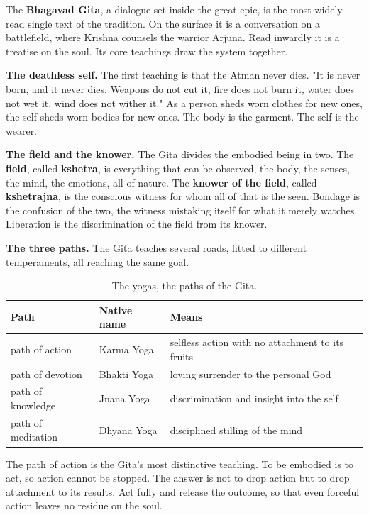 The \textbf{Bhagavad Gita}, a dialogue set inside the great epic, is the most widely read single text of the tradition. On the surface it is a conversation on a battlefield, where Krishna counsels the warrior Arjuna. Read inwardly it is a treatise on the soul. Its core teachings draw the system together.

\textbf{The deathless self.} The first teaching is that the Atman never dies. "It is never born, and it never dies. Weapons do not cut it, fire does not burn it, water does not wet it, wind does not wither it." As a person sheds worn clothes for new ones, the self sheds worn bodies for new ones. The body is the garment. The self is the wearer.

\textbf{The field and the knower.} The Gita divides the embodied being in two. The \textbf{field}, called \textbf{kshetra}, is everything that can be observed, the body, the senses, the mind, the emotions, all of nature. The \textbf{knower of the field}, called \textbf{kshetrajna}, is the conscious witness for whom all of that is the seen. Bondage is the confusion of the two, the witness mistaking itself for what it merely watches. Liberation is the discrimination of the field from its knower.

\textbf{The three paths.} The Gita teaches several roads, fitted to different temperaments, all reaching the same goal.

\begin{longtable}{@{} L{0.26\textwidth}L{0.22\textwidth}L{0.40\textwidth}@{}}
\caption{The yogas, the paths of the Gita.}\\
\toprule
\textbf{Path} & \textbf{Native name} & \textbf{Means} \\
\midrule
path of action & Karma Yoga & selfless action with no attachment to its fruits \\
path of devotion & Bhakti Yoga & loving surrender to the personal God \\
path of knowledge & Jnana Yoga & discrimination and insight into the self \\
path of meditation & Dhyana Yoga & disciplined stilling of the mind \\
\bottomrule
\end{longtable}

The path of action is the Gita's most distinctive teaching. To be embodied is to act, so action cannot be stopped. The answer is not to drop action but to drop attachment to its results. Act fully and release the outcome, so that even forceful action leaves no residue on the soul.

